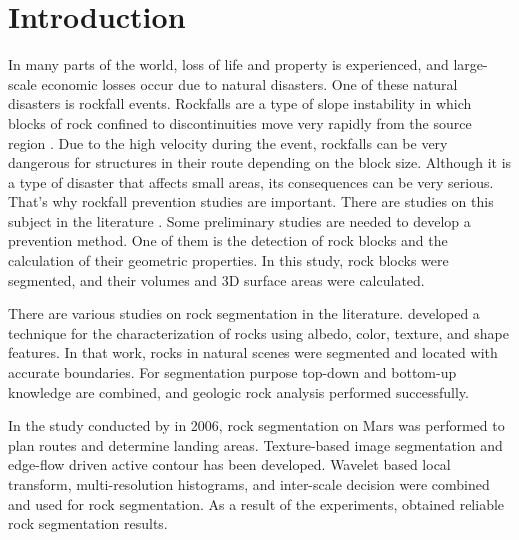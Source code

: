 \documentclass[a4paper,fleqn]{cas-sc}
\begin{document}
\maketitle 

\printcredits

\doublespacing


\section{Introduction}
\label{intro}
In many parts of the world, loss of life and property is experienced, and large-scale economic losses occur due to natural disasters. One of these natural disasters is rockfall events. Rockfalls are a type of slope instability in which blocks of rock confined to discontinuities move very rapidly from the source region \citep{varnes1978slope, hutchinson1988morphological, CrudenVarnes1996}. Due to the high velocity during the event, rockfalls can be very dangerous for structures in their route depending on the block size. Although it is a type of disaster that affects small areas, its consequences can be very serious. That's why rockfall prevention studies are important. There are studies on this subject in the literature \citep{liu2021trajectory, keskin2022kinematic,ji2023assessment,kainthola2023stability, cao2024risk}. Some preliminary studies are needed to develop a prevention method. One of them is the detection of rock blocks and the calculation of their geometric properties. In this study, rock blocks were segmented, and their volumes and 3D surface areas were calculated. 

There are various studies on rock segmentation in the literature. \cite{dunlop2006automatic} developed a technique for the characterization of rocks using albedo, color, texture, and shape features. In that work, rocks in natural scenes were segmented and located with accurate boundaries. For segmentation purpose top-down and bottom-up knowledge are combined, and geologic rock analysis performed successfully.

In the study conducted by \cite{Song2006AFF} in 2006, rock segmentation on Mars was performed to plan routes and determine landing areas. Texture-based image segmentation and edge-flow driven active contour has been developed. Wavelet based local transform, multi-resolution histograms, and inter-scale decision were combined and used for rock segmentation. As a result of the experiments, \cite{Song2006AFF} obtained reliable rock segmentation results.
\end{document}
